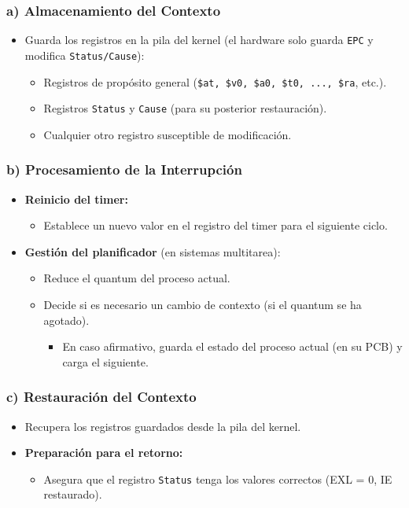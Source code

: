 \documentclass{article}
\begin{document}
\subsubsection*{a) Almacenamiento del Contexto}
\begin{itemize}
    \item Guarda los registros en la pila del kernel (el hardware solo guarda \texttt{EPC} y modifica \texttt{Status/Cause}):
    \begin{itemize}
        \item Registros de propósito general (\texttt{\$at, \$v0, \$a0, \$t0, ..., \$ra}, etc.).
        \item Registros \texttt{Status} y \texttt{Cause} (para su posterior restauración).
        \item Cualquier otro registro susceptible de modificación.
    \end{itemize}
\end{itemize}

\subsubsection*{b) Procesamiento de la Interrupción}
\begin{itemize}
    \item \textbf{Reinicio del timer:}
    \begin{itemize}
        \item Establece un nuevo valor en el registro del timer para el siguiente ciclo.
    \end{itemize}
    \item \textbf{Gestión del planificador} (en sistemas multitarea):
    \begin{itemize}
        \item Reduce el quantum del proceso actual.
        \item Decide si es necesario un cambio de contexto (si el quantum se ha agotado).
        \begin{itemize}
            \item En caso afirmativo, guarda el estado del proceso actual (en su PCB) y carga el siguiente.
        \end{itemize}
    \end{itemize}
\end{itemize}

\subsubsection*{c) Restauración del Contexto}
\begin{itemize}
    \item Recupera los registros guardados desde la pila del kernel.
    \item \textbf{Preparación para el retorno:}
    \begin{itemize}
        \item Asegura que el registro \texttt{Status} tenga los valores correctos (EXL = 0, IE restaurado).
    \end{itemize}
\end{itemize}
\end{document}
